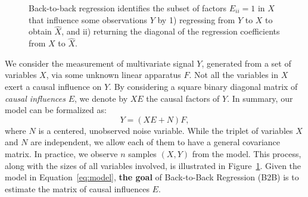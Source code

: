 \documentclass{article}
\begin{document}
\begin{figure}[t!]
    \caption{Back-to-back regression identifies the subset of factors $E_{ii} = 1$ in $X$ that influence some observations $Y$ by 1) regressing from $Y$ to $X$ to obtain $\hat{X}$, and ii) returning the diagonal of the regression coefficients from $X$ to $\hat{X}$.}
    \label{fig:b2b}
\end{figure}

We consider the measurement of multivariate signal $Y$, generated from a set of variables $X$, via some unknown linear apparatus $F$.
%
Not all the variables in $X$ exert a causal influence on $Y$.
%
By considering a square binary diagonal matrix of \emph{causal influences} $E$, we denote by $XE$ the causal factors of $Y$.
%
In summary, our model can be formalized as:
%
\begin{equation}
    Y = (XE + N)F,\label{eq:model}
\end{equation}
%
where $N$ is a centered, unobserved noise variable.
%
While the triplet of variables $X$ and $N$ are independent, we allow each of them to have a general covariance matrix.
%
In practice, we observe $n$ samples $(X, Y)$ from the model.
%
This process, along with the sizes of all variables involved, is illustrated in Figure~\ref{fig:b2b}.
%
Given the model in Equation~\eqref{eq:model}, \textbf{the goal} of Back-to-Back Regression (B2B) is to estimate the matrix of causal influences $E$.
\end{document}

